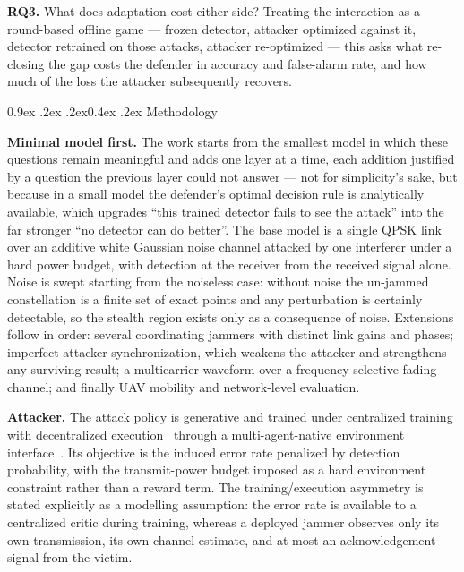 \documentclass[10pt,a4paper]{article}
\makeatletter
\renewcommand\section{\@startsection{section}{1}{\z@}%
  {0.9ex \@plus .2ex \@minus .2ex}{0.4ex \@plus .2ex}%
  {\normalfont\large\bfseries}}
\makeatother
\begin{document}
\textbf{RQ3.} What does adaptation cost either side? Treating the interaction as a round-based
offline game --- frozen detector, attacker optimized against it, detector retrained on those
attacks, attacker re-optimized --- this asks what re-closing the gap costs the defender in
accuracy and false-alarm rate, and how much of the loss the attacker subsequently recovers.

\section{Methodology}

\textbf{Minimal model first.} The work starts from the smallest model in which these questions
remain meaningful and adds one layer at a time, each addition justified by a question the
previous layer could not answer --- not for simplicity's sake, but because in a small model the
defender's optimal decision rule is analytically available, which upgrades ``this trained
detector fails to see the attack'' into the far stronger ``no detector can do better''. The base
model is a single QPSK link over an additive white Gaussian noise channel attacked by one
interferer under a hard power budget, with detection at the receiver from the received signal
alone. Noise is swept starting from the noiseless case: without noise the un-jammed constellation
is a finite set of exact points and any perturbation is certainly detectable, so the stealth
region exists only as a consequence of noise. Extensions follow in order: several coordinating
jammers with distinct link gains and phases; imperfect attacker synchronization, which weakens
the attacker and strengthens any surviving result; a multicarrier waveform over a
frequency-selective fading channel; and finally UAV mobility and network-level evaluation.

\textbf{Attacker.} The attack policy is generative and trained under centralized training with
decentralized execution~\cite{lowe2017maddpg} through a multi-agent-native environment
interface~\cite{terry2021pettingzoo}. Its objective is the induced error rate penalized by
detection probability, with the transmit-power budget imposed as a hard environment constraint
rather than a reward term. The training/execution asymmetry is stated explicitly as a modelling
assumption: the error rate is available to a centralized critic during training, whereas a
deployed jammer observes only its own transmission, its own channel estimate, and at most an
acknowledgement signal from the victim.
\end{document}
